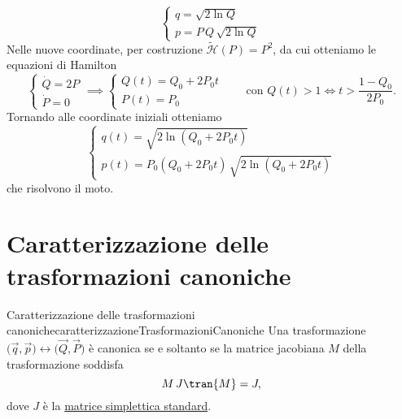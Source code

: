 \begin{ese}
\[\begin{cases}
			q = \sqrt{2\ln Q} \\
			p = P\,Q\,\sqrt{2\ln Q}
		\end{cases}
	\]
	Nelle nuove coordinate, per costruzione \(\tilde{\mathcal{H}}(P)=P^2\), da cui otteniamo le equazioni di Hamilton
	\[
		\begin{cases}
			\dot{Q} = 2P \\
			\dot{P} = 0
		\end{cases} \implies
		\begin{cases}
			Q(t) = Q_0 +2 P_0 t \\
			P(t) = P_0
		\end{cases} \qquad\text{con } Q(t) > 1 \iff t > \frac{1-Q_0}{2P_0}.
	\]
	Tornando alle coordinate iniziali otteniamo
	\[
		\begin{cases}
			q(t) = \sqrt{2\ln(Q_0+2P_0 t)} \\
			p(t) = P_0 (Q_0+2P_0 t)\,\sqrt{2\ln(Q_0+2P_0 t)}
		\end{cases}
	\]
	che risolvono il moto.
\end{ese}
%
%
\section{Caratterizzazione delle trasformazioni canoniche}

\begin{teor}{Caratterizzazione delle trasformazioni canoniche}{caratterizzazioneTrasformazioniCanoniche}
	Una trasformazione \(\big(\vec{q},\vec{p}\big) \longleftrightarrow \big(\vec{Q},\vec{P}\big)\) è canonica se e soltanto se la matrice jacobiana \(M\) della trasformazione soddisfa
	\[
		M\,J \tran{M} = J,
	\]
	dove \(J\) è la \hyperref[df:matriceSimpletticaStandard]{matrice simplettica standard}.
\end{teor}

